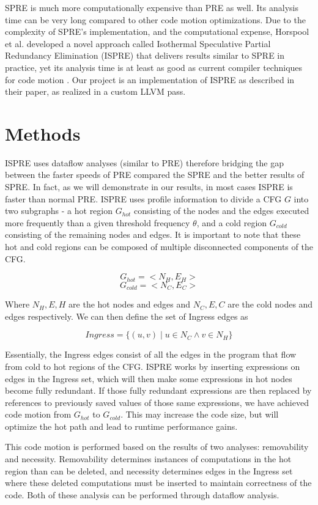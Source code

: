 \documentclass[sigplan,screen]{acmart}
\begin{document}
    SPRE is much more computationally expensive than PRE as well. Its analysis time can be very long compared to other code motion optimizations. Due to the complexity of SPRE's implementation, and the computational expense, Horspool et al. developed a novel approach called Isothermal Speculative Partial Redundancy Elimination (ISPRE) that delivers results similar to SPRE in practice, yet its analysis time is at least as good as current compiler techniques for code motion \cite{ispre_paper}. Our project is an implementation of ISPRE as described in their paper, as realized in a custom LLVM pass. 

    \section{Methods}
	\label{sec:methods}

    ISPRE uses dataflow analyses (similar to PRE) therefore bridging the gap between the faster speeds of PRE compared the SPRE and the better results of SPRE. In fact, as we will demonstrate in our results, in most cases ISPRE is faster than normal PRE. ISPRE uses profile information to divide a CFG $G$ into two subgraphs - a hot region $G_{hot}$ consisting of the nodes and the edges executed more frequently than a given threshold frequency $\theta$, and a cold region $G_{cold}$ consisting of the remaining nodes and edges. It is important to note that these hot and cold regions can be composed of multiple disconnected components of the CFG.
 
    \[G_{hot} = <N_H, E_H>\]  
    \[G_{cold} = <N_C, E_C>\]

    Where \(N_H , E,H\) are the hot nodes and edges and \(N_C , E,C\) are the cold nodes and edges respectively. We can then define the set of Ingress edges as

    \[{Ingress} = \{(u,v)\;|\;u \in N_C \wedge v \in N_H \}\]

    Essentially, the Ingress edges consist of all the edges in the program that flow from cold to hot regions of the CFG. ISPRE works by inserting expressions on edges in the Ingress set, which will then make some expressions in hot nodes become fully redundant. If those fully redundant expressions are then replaced by references to previously saved values of those same expressions, we have achieved code motion from $G_{hot}$ to $G_{cold}$. This may increase the code size, but will optimize the hot path and lead to runtime performance gains.

    This code motion is performed based on the results of two analyses: removability and necessity. Removability determines instances of computations in the hot region than can be deleted, and necessity determines edges in the Ingress set where these deleted computations must be inserted to maintain correctness of the code. Both of these analysis can be performed through dataflow analysis. 
\end{document}
